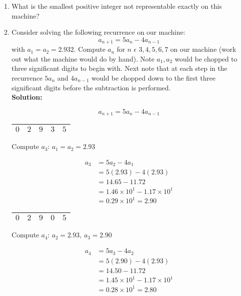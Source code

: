 \documentclass{article}
\begin{document}
\begin{enumerate}
\begin{enumerate}
\item What is the smallest positive integer not representable exactly on this machine?


\vspace{1cm}

\item Consider solving the following recurrence on our machine:
    $$a_{n+1} = 5a_{n} - 4a_{n-1}$$
with $a_{1} = a_{2} = 2.932$. Compute $a_{n}$ for $n$ $\epsilon$ ${3,4,5,6,7}$ on our
machine (work out what the machine would do by hand). Note $a_{1}, a_{2}$ would be chopped 
to three significant digits to begin with. Next note that at each step in the recurrence
$5a_{n}$ and $4a_{n-1}$ would be chopped down to the first three significant digits before 
the subtraction is performed. \\

\textbf{Solution:}

    $$a_{n+1} = 5a_{n} - 4a_{n-1}$$

\begin{center}
\renewcommand{\arraystretch}{1.7}
\begin{tabular}{|c|c|c|c|c|}
\hline
$0$ & $2$ & $9$ & $3$ & $5$ \\
\hline
\end{tabular}
\end{center}

        Compute $a_{3}$: $a_{1} = a_{2} = 2.93$

        \begin{align*}
        a_{3} &= 5a_{2} - 4a_{1} \\
            &= 5(2.93) - 4(2.93) \\
            &= 14.65 - 11.72 \\
            &= 1.46 \times 10^{1} - 1.17 \times 10^{1} \\
            &= 0.29 \times 10^{1} = 2.90
        \end{align*}

        \begin{center}
        \renewcommand{\arraystretch}{1.7}
        \begin{tabular}{|c|c|c|c|c|}
        \hline
        $0$ & $2$ & $9$ & $0$ & $5$ \\
        \hline
        \end{tabular}
        \end{center}


        Compute $a_{4}$: $a_{2} = 2.93, \ a_{3} = 2.90$

        \begin{align*}
         a_{4} &= 5a_{3} - 4a_{2} \\
            &= 5(2.90) - 4(2.93) \\
            &= 14.50 - 11.72 \\
            &= 1.45 \times 10^{1} - 1.17 \times 10^{1} \\
            &= 0.28 \times 10^{1} = 2.80
        \end{align*}


\end{enumerate}
\end{enumerate}
\end{document}
